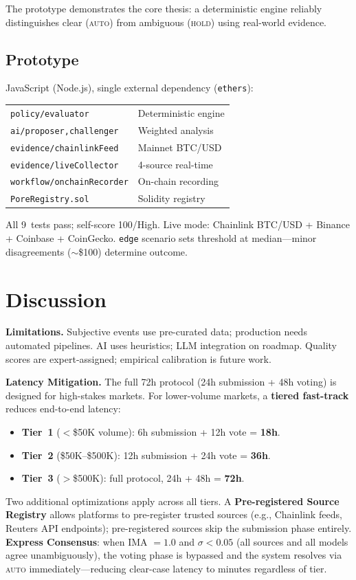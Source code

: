 \documentclass[11pt,a4paper,twocolumn]{article}
\begin{document}
The prototype demonstrates the core thesis: a deterministic engine reliably distinguishes clear (\textsc{auto}) from ambiguous (\textsc{hold}) using real-world evidence.

\subsection{Prototype}

JavaScript (Node.js), single external dependency (\texttt{ethers}):

\smallskip
{\footnotesize
\begin{tabular}{@{}ll@{}}
\texttt{policy/evaluator} & Deterministic engine \\
\texttt{ai/proposer,challenger} & Weighted analysis \\
\texttt{evidence/chainlinkFeed} & Mainnet BTC/USD \\
\texttt{evidence/liveCollector} & 4-source real-time \\
\texttt{workflow/onchainRecorder} & On-chain recording \\
\texttt{PoreRegistry.sol} & Solidity registry \\
\end{tabular}
}
\smallskip

\noindent All 9~tests pass; self-score 100/High. Live mode: Chainlink BTC/USD + Binance + Coinbase + CoinGecko. \texttt{edge} scenario sets threshold at median---minor disagreements ($\sim$\$100) determine outcome.

\section{Discussion}

\textbf{Limitations.} Subjective events use pre-curated data; production needs automated pipelines. AI uses heuristics; LLM integration on roadmap. Quality scores are expert-assigned; empirical calibration is future work.

\textbf{Latency Mitigation.} The full 72h protocol (24h submission + 48h voting) is designed for high-stakes markets. For lower-volume markets, a \textbf{tiered fast-track} reduces end-to-end latency:
\begin{itemize}[nosep]
    \item \textbf{Tier~1} ($<$\$50K volume): 6h submission + 12h vote = \textbf{18h}.
    \item \textbf{Tier~2} (\$50K--\$500K): 12h submission + 24h vote = \textbf{36h}.
    \item \textbf{Tier~3} ($>$\$500K): full protocol, 24h + 48h = \textbf{72h}.
\end{itemize}
Two additional optimizations apply across all tiers. A \textbf{Pre-registered Source Registry} allows platforms to pre-register trusted sources (e.g., Chainlink feeds, Reuters API endpoints); pre-registered sources skip the submission phase entirely. \textbf{Express Consensus}: when IMA $= 1.0$ and $\sigma < 0.05$ (all sources and all models agree unambiguously), the voting phase is bypassed and the system resolves via \textsc{auto} immediately---reducing clear-case latency to minutes regardless of tier.
\end{document}
